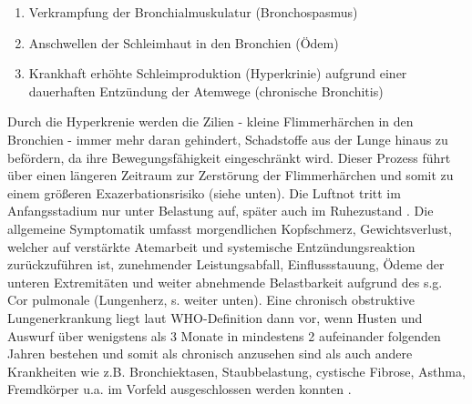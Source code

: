 \begin{enumerate}
\item Verkrampfung der Bronchialmuskulatur (Bronchospasmus)
\item Anschwellen der Schleimhaut in den Bronchien (Ödem)
\item Krankhaft erhöhte Schleimproduktion (Hyperkrinie) aufgrund einer dauerhaften Entzündung der Atemwege (chronische Bronchitis)
\end{enumerate}

Durch die Hyperkrenie werden die Zilien - kleine Flimmerhärchen in den Bronchien - immer mehr daran gehindert, Schadstoffe aus der Lunge hinaus zu befördern, da ihre Bewegungsfähigkeit eingeschränkt wird. Dieser Prozess führt über einen längeren Zeitraum zur Zerstörung der Flimmerhärchen und somit zu einem größeren Exazerbationsrisiko (siehe unten).
Die Luftnot tritt im Anfangsstadium nur unter Belastung auf, später auch im Ruhezustand \autocite[vgl.][6f.]{lorenz2009}. Die allgemeine Symptomatik umfasst morgendlichen Kopfschmerz, Gewichtsverlust, welcher auf verstärkte Atemarbeit und systemische Entzündungsreaktion zurückzuführen ist, zunehmender Leistungsabfall, Einflussstauung, Ödeme der unteren Extremitäten und weiter abnehmende Belastbarkeit aufgrund des s.g. Cor pulmonale (Lungenherz, s. weiter unten).
Eine chronisch obstruktive Lungenerkrankung liegt laut WHO-Definition dann vor, wenn Husten und Auswurf über wenigstens als 3 Monate in mindestens 2 aufeinander folgenden Jahren bestehen und somit als chronisch anzusehen sind als auch andere Krankheiten wie z.B. Bronchiektasen, Staubbelastung, cystische Fibrose, Asthma, Fremdkörper u.a. im Vorfeld ausgeschlossen werden konnten \autocite[vgl.][71]{koehler2010}. 


